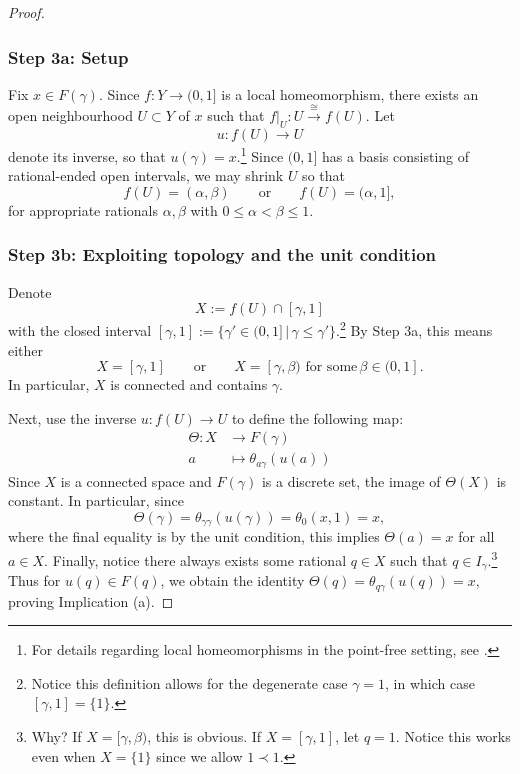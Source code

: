 \documentclass[a4paper, 11pt,reqno]{amsart}
\begin{document}
\begin{proof}
	\subsubsection*{Step 3a: Setup} Fix $x\in F(\gamma)$. Since $f\colon Y\rightarrow (0,1]$ is a local homeomorphism, there exists an open neighbourhood $U\subset Y$ of $x$ such that $f|_U\colon U\xrightarrow{\cong}f(U)$.  
	Let
$$	u\colon f(U)\longrightarrow U$$
	denote its inverse, so that $u(\gamma)=x$.\footnote{For details regarding local homeomorphisms in the point-free setting, see \cite[\S 5.1]{Vi07}.} Since $(0,1]$ has a basis consisting of rational-ended open intervals, we may shrink $U$ so that
$$	f(U)=(\alpha,\beta)
\qquad\text{or}\qquad
f(U)=(\alpha,1],$$
	for appropriate rationals $\alpha,\beta$ with $0\leq\alpha<\beta\leq1$.
	
	
	\subsubsection*{Step 3b: Exploiting topology and the unit condition} Denote
	\[X:=f(U)\cap [\gamma,1]\]
	with the closed interval $[\gamma,1]:=\{\gamma'\in(0,1] \,|\, \gamma\leq\gamma' \}$.\footnote{Notice this definition allows for the degenerate case $\gamma=1$, in which case $[\gamma,1]=\{1\}$.} By Step 3a, this means either
	$$	X=[\gamma,1]
	\qquad\text{or}\qquad
	X=[\gamma,\beta)\,\,\text{for some}\, \beta\in (0,1].$$
	In particular, $X$ is connected and contains $\gamma$. 
	
	
	
	
Next, use the inverse $u\colon f(U)\rightarrow U$ to define the following map:
	\begin{align*}
	\Theta \colon  X& \longrightarrow F(\gamma)\\
	a&\longmapsto \theta_{a\gamma}(u(a))
	\end{align*}
Since $X$ is a connected space and $F(\gamma)$ is a discrete set, the image of $\Theta (X)$ is constant. In particular, since
	\[\Theta(\gamma)=\theta_{\gamma\gamma}(u(\gamma))=\theta_0(x,1)=x,\]
	where the final equality is by the unit condition, this implies $\Theta(a)=x$ for all $a\in X$. Finally,  notice there always exists some rational $q\in X$ such that $q\in I_\gamma$.\footnote{Why? If $X=[\gamma,\beta)$, this is obvious. If $X=[\gamma,1]$, let $q=1$. Notice this works even when $X=\{1\}$ since we allow $1\prec 1$.} Thus for $u(q)\in F(q)$, we obtain the identity $\Theta(q)=\theta_{q\gamma}(u(q))=x$, proving Implication (a).
	

\end{proof}
\end{document}
